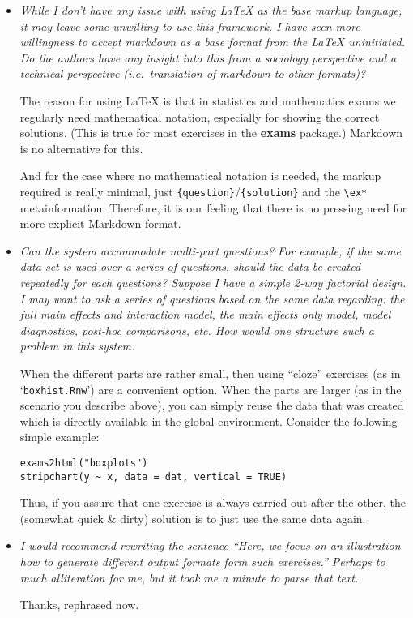 \documentclass[a4paper]{article}
\begin{document}
\begin{itemize}
But maybe, Fritz, you have a better suggestion based on your experiences at Boku?

F: I currently don't need more tags beyond what we have in
\verb|read_metainfo|, and certainly not answernumbering. But \verb|\exextra| could
make a lot of sense, because one could very quickly use an extra
option for a particular driver $\rightarrow$ on 2do list for future versions?
Implement without using seems silly to me.


\item {\it
While I don't have any issue with using {\LaTeX} as the base markup
language, it may leave some unwilling to use this framework. I have seen
more willingness to accept markdown as a base format from the {\LaTeX}
uninitiated. Do the authors have any insight into this from a sociology
perspective and a technical perspective (i.e.\ translation of markdown to
other formats)?}

The reason for using {\LaTeX} is that in statistics and mathematics exams we
regularly need mathematical notation, especially for showing the correct
solutions. (This is true for most exercises in the \textbf{exams} package.)
Markdown is no alternative for this.

And for the case where no mathematical notation is needed, the markup
required is really minimal, just \verb|{question}|/\verb|{solution}| and
the \verb|\ex*| metainformation. Therefore, it is our feeling that there
is no pressing need for more explicit Markdown format.

\item {\it
Can the system accommodate multi-part questions? For example, if the
same data set is used over a series of questions, should the data be
created repeatedly for each questions? Suppose I have a simple 2-way
factorial design. I may want to ask a series of questions based on the
same data regarding: the full main effects and interaction model, the main
effects only model, model diagnostics, post-hoc comparisons, etc. How
would one structure such a problem in this system.}

When the different parts are rather small, then using ``cloze'' exercises
(as in `\texttt{boxhist.Rnw}') are a convenient option. When the parts are larger
(as in the scenario you describe above), you can simply reuse the data
that was created which is directly available in the global environment.
Consider the following simple example:
\begin{verbatim}
exams2html("boxplots")
stripchart(y ~ x, data = dat, vertical = TRUE)
\end{verbatim}
Thus, if you assure that one exercise is always carried out after the
other, the (somewhat quick \& dirty) solution is to just use the same
data again.

\item {\it
I would recommend rewriting the sentence ``Here, we focus on an
illustration how to generate different output formats form such
exercises.'' Perhaps to much alliteration for me, but it took me a minute
to parse that text.}

Thanks, rephrased now.

\end{itemize}
\end{document}
